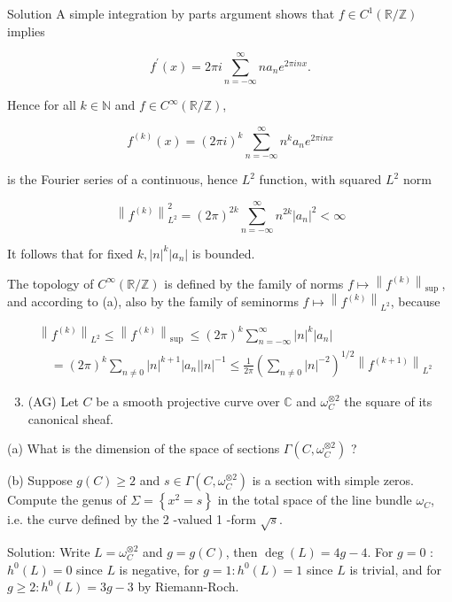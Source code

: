 \documentclass[10pt]{article}
\begin{document}
Solution A simple integration by parts argument shows that $f \in C^{1}(\mathbb{R} / \mathbb{Z})$ implies

$$
f^{\prime}(x)=2 \pi i \sum_{n=-\infty}^{\infty} n a_{n} e^{2 \pi i n x} .
$$

Hence for all $k \in \mathbb{N}$ and $f \in C^{\infty}(\mathbb{R} / \mathbb{Z})$,

$$
f^{(k)}(x)=(2 \pi i)^{k} \sum_{n=-\infty}^{\infty} n^{k} a_{n} e^{2 \pi i n x}
$$

is the Fourier series of a continuous, hence $L^{2}$ function, with squared $L^{2}$ norm

$$
\left\|f^{(k)}\right\|_{L^{2}}^{2}=(2 \pi)^{2 k} \sum_{n=-\infty}^{\infty} n^{2 k}\left|a_{n}\right|^{2}<\infty
$$

It follows that for fixed $k,|n|^{k}\left|a_{n}\right|$ is bounded.

The topology of $C^{\infty}(\mathbb{R} / \mathbb{Z})$ is defined by the family of norms $f \mapsto\left\|f^{(k)}\right\|_{\text {sup }}$, and according to (a), also by the family of seminorms $f \mapsto\left\|f^{(k)}\right\|_{L^{2}}$, because

$$
\begin{aligned}
& \left\|f^{(k)}\right\|_{L^{2}} \leq\left\|f^{(k)}\right\|_{\text {sup }} \leq(2 \pi)^{k} \sum_{n=-\infty}^{\infty}|n|^{k}\left|a_{n}\right| \\
& \quad=(2 \pi)^{k} \sum_{n \neq 0}|n|^{k+1}\left|a_{n}\right||n|^{-1} \leq \frac{1}{2 \pi}\left(\sum_{n \neq 0}|n|^{-2}\right)^{1 / 2}\left\|f^{(k+1)}\right\|_{L^{2}}
\end{aligned}
$$

\begin{enumerate}
  \setcounter{enumi}{2}
  \item (AG) Let $C$ be a smooth projective curve over $\mathbb{C}$ and $\omega_{C}^{\otimes 2}$ the square of its canonical sheaf.
\end{enumerate}

(a) What is the dimension of the space of sections $\Gamma\left(C, \omega_{C}^{\otimes 2}\right)$ ?

(b) Suppose $g(C) \geq 2$ and $s \in \Gamma\left(C, \omega_{C}^{\otimes 2}\right)$ is a section with simple zeros. Compute the genus of $\Sigma=\left\{x^{2}=s\right\}$ in the total space of the line bundle $\omega_{C}$, i.e. the curve defined by the 2 -valued 1 -form $\sqrt{s}$.

Solution: Write $L=\omega_{C}^{\otimes 2}$ and $g=g(C)$, then $\operatorname{deg}(L)=4 g-4$. For $g=0$ : $h^{0}(L)=0$ since $L$ is negative, for $g=1: h^{0}(L)=1$ since $L$ is trivial, and for $g \geq 2: h^{0}(L)=3 g-3$ by Riemann-Roch.
\end{document}

